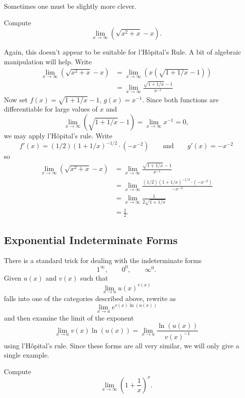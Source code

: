 Sometimes one must be slightly more clever. 

\begin{example}[$\pmb\infty$--$\pmb\infty$]
Compute
\[
\lim_{x\to\infty}\left(\sqrt{x^2+x}-x\right).
\]
\end{example}

\begin{solution}
Again, this doesn't appear to be suitable for l'H\^opital's Rule. A bit of algebraic manipulation will help. Write
\begin{align*}
\lim_{x\to\infty}\left(\sqrt{x^2+x}-x\right) &= \lim_{x\to\infty}\left(x\left(\sqrt{1+1/x}-1\right)\right)\\
&=\lim_{x\to\infty}\frac{\sqrt{1+1/x}-1}{x^{-1}}
\end{align*}
Now set $f(x) = \sqrt{1+1/x}-1$, $g(x) = x^{-1}$. Since both
  functions are differentiable for large values of $x$ and 
\[
\lim_{x\to\infty} (\sqrt{1+1/x}-1) = \lim_{x\to\infty}x^{-1} = 0, 
\]
we may apply l'H\^opital's rule. Write
\[
f'(x) = (1/2)(1+1/x)^{-1/2}\cdot(-x^{-2}) \qquad \text{and}\qquad g'(x) = -x^{-2}
\]
so
\begin{align*}
\lim_{x\to\infty}\left(\sqrt{x^2+x}-x\right) &= \lim_{x\to\infty}\frac{\sqrt{1+1/x}-1}{x^{-1}} \\
&= \lim_{x\to\infty}\frac{(1/2)(1+1/x)^{-1/2}\cdot(-x^{-2})}{-x^{-2}} \\
&= \lim_{x\to\infty} \frac{1}{2\sqrt{1+1/x}}\\
&= \frac{1}{2}.
\end{align*}
\end{solution}


\subsection*{Exponential Indeterminate Forms}

There is a standard trick for dealing with the indeterminate forms
\[
1^\infty,\qquad 0^0,\qquad \infty^0.
\]
Given $u(x)$ and $v(x)$ such that
\[
\lim_{x\to a}u(x)^{v(x)}
\]
falls into one of the categories described above, rewrite as
\[
\lim_{x\to a}e^{v(x)\ln(u(x))}
\]
and then examine the limit of the exponent
\[
\lim_{x\to a} v(x)\ln(u(x)) = \lim_{x\to a} \frac{\ln(u(x))}{v(x)^{-1}}
\]
using l'H\^opital's rule.  Since these forms are all very similar, we
will only give a single example.


\begin{example}
Compute
\[
\lim_{x\to \infty}\left(1 + \frac{1}{x}\right)^x.
\]
\end{example}

